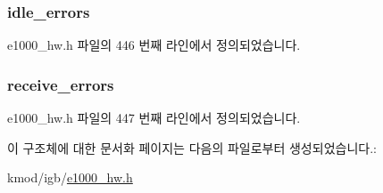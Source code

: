 \subsubsection[{\texorpdfstring{idle\+\_\+errors}{idle_errors}}]{ idle\+\_\+errors}\hypertarget{structe1000__phy__stats_ad887e85e6e554233f79d12cccd018a15}{}\label{structe1000__phy__stats_ad887e85e6e554233f79d12cccd018a15}


e1000\+\_\+hw.\+h 파일의 446 번째 라인에서 정의되었습니다.

\subsubsection[{\texorpdfstring{receive\+\_\+errors}{receive_errors}}]{ receive\+\_\+errors}\hypertarget{structe1000__phy__stats_a49303efd179dc55f9da8da9baad13de2}{}\label{structe1000__phy__stats_a49303efd179dc55f9da8da9baad13de2}


e1000\+\_\+hw.\+h 파일의 447 번째 라인에서 정의되었습니다.



이 구조체에 대한 문서화 페이지는 다음의 파일로부터 생성되었습니다.\+:\begin{DoxyCompactItemize}
\item 
kmod/igb/\hyperlink{kmod_2igb_2e1000__hw_8h}{e1000\+\_\+hw.\+h}\end{DoxyCompactItemize}
